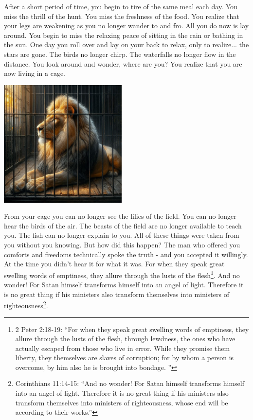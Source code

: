 \documentclass[10pt]{article}
\begin{document}
\begin{multicols}{2}
After a short period of time, you begin to tire of the same meal each day. You miss the thrill of the hunt. You miss the freshness of the food. You realize that your legs are weakening as you no longer wander to and fro. All you do now is lay around. You begin to miss the relaxing peace of sitting in the rain or bathing in the sun. One day you roll over and lay on your back to relax, only to realize... the stars are gone. The birds no longer chirp. The waterfalls no longer flow in the distance. You look around and wonder, where are you? You realize that you are now living in a cage. 

\begin{center}
	\includegraphics[width=0.48\textwidth]{cage.jpeg}
\end{center}

From your cage you can no longer see the lilies of the field. You can no longer hear the birds of the air. The beasts of the field are no longer available to teach you. The fish can no longer explain to you. All of these things were taken from you without you knowing. But how did this happen? The man who offered you comforts and freedoms technically spoke the truth - and you accepted it willingly. At the time you didn't hear it for what it was. For when they speak great swelling words of emptiness, they allure through the lusts of the flesh\footnote{2 Peter 2:18-19: ``For when they speak great swelling words of emptiness, they allure through the lusts of the flesh, through lewdness, the ones who have actually escaped from those who live in error. While they promise them liberty, they themselves are slaves of corruption; for by whom a person is overcome, by him also he is brought into bondage. ''}. And no wonder! For Satan himself transforms himself into an angel of light. Therefore it is no great thing if his ministers also transform themselves into ministers of righteousness\footnote{Corinthians 11:14-15: ``And no wonder! For Satan himself transforms himself into an angel of light. Therefore it is no great thing if his ministers also transform themselves into ministers of righteousness, whose end will be according to their works.''}.


\end{multicols}
\end{document}
